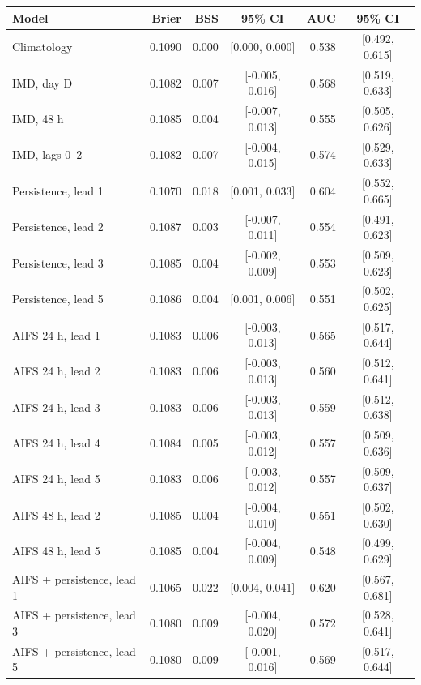 \begin{tabular}{lrrcrc}\toprule
Model & Brier & BSS & 95\% CI & AUC & 95\% CI \\ \midrule
Climatology & 0.1090 & 0.000 & [0.000, 0.000] & 0.538 & [0.492, 0.615] \\
IMD, day D & 0.1082 & 0.007 & [-0.005, 0.016] & 0.568 & [0.519, 0.633] \\
IMD, 48 h & 0.1085 & 0.004 & [-0.007, 0.013] & 0.555 & [0.505, 0.626] \\
IMD, lags 0--2 & 0.1082 & 0.007 & [-0.004, 0.015] & 0.574 & [0.529, 0.633] \\
\midrule
Persistence, lead 1 & 0.1070 & 0.018 & [0.001, 0.033] & 0.604 & [0.552, 0.665] \\
Persistence, lead 2 & 0.1087 & 0.003 & [-0.007, 0.011] & 0.554 & [0.491, 0.623] \\
Persistence, lead 3 & 0.1085 & 0.004 & [-0.002, 0.009] & 0.553 & [0.509, 0.623] \\
Persistence, lead 5 & 0.1086 & 0.004 & [0.001, 0.006] & 0.551 & [0.502, 0.625] \\
\midrule
AIFS 24 h, lead 1 & 0.1083 & 0.006 & [-0.003, 0.013] & 0.565 & [0.517, 0.644] \\
AIFS 24 h, lead 2 & 0.1083 & 0.006 & [-0.003, 0.013] & 0.560 & [0.512, 0.641] \\
AIFS 24 h, lead 3 & 0.1083 & 0.006 & [-0.003, 0.013] & 0.559 & [0.512, 0.638] \\
AIFS 24 h, lead 4 & 0.1084 & 0.005 & [-0.003, 0.012] & 0.557 & [0.509, 0.636] \\
AIFS 24 h, lead 5 & 0.1083 & 0.006 & [-0.003, 0.012] & 0.557 & [0.509, 0.637] \\
\midrule
AIFS 48 h, lead 2 & 0.1085 & 0.004 & [-0.004, 0.010] & 0.551 & [0.502, 0.630] \\
AIFS 48 h, lead 5 & 0.1085 & 0.004 & [-0.004, 0.009] & 0.548 & [0.499, 0.629] \\
\midrule
AIFS + persistence, lead 1 & 0.1065 & 0.022 & [0.004, 0.041] & 0.620 & [0.567, 0.681] \\
AIFS + persistence, lead 3 & 0.1080 & 0.009 & [-0.004, 0.020] & 0.572 & [0.528, 0.641] \\
AIFS + persistence, lead 5 & 0.1080 & 0.009 & [-0.001, 0.016] & 0.569 & [0.517, 0.644] \\
\bottomrule\end{tabular}